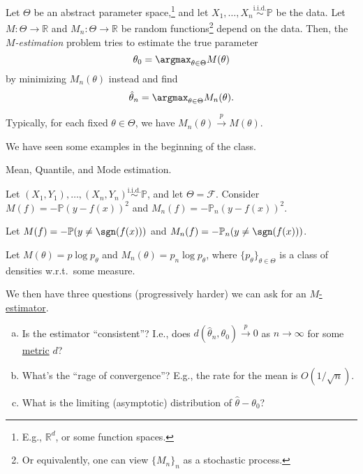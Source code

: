 \begin{problem}[\(M\)-estimation]\label{prb:M-estimation}
Let \(\Theta \) be an abstract parameter space,\footnote{E.g., \(\mathbb{R} ^d\), or some function spaces.} and let \(X_1, \dots , X_n \overset{\text{i.i.d.} }{\sim } \mathbb{P} \) be the data. Let \(M \colon \Theta \to \mathbb{R} \) and \(M_n\colon \Theta \to \mathbb{R} \) be random functions\footnote{Or equivalently, one can view \(\{ M_n \} _n\) as a stochastic process.} depend on the data. Then, the \emph{\(M\)-estimation} problem tries to estimate the true parameter
\[
	\theta _0 = \argmax_{\theta \in \Theta } M(\theta )
\]
by minimizing \(M_n(\theta )\) instead and find
\[
	\hat{\theta} _n = \argmax_{\theta \in \Theta } M_n(\theta ).
\]
\end{problem}

\begin{remark}
	Typically, for each fixed \(\theta \in \Theta \), we have \(M_n(\theta ) \overset{p}{\to } M(\theta )\).
\end{remark}

We have seen some examples in the beginning of the class.

\begin{eg}
	Mean, Quantile, and Mode estimation.
\end{eg}

\begin{eg}
	Let \((X_1, Y_1), \dots , (X_n, Y_n) \overset{\text{i.i.d.} }{\sim } \mathbb{P} \), and let \(\Theta = \mathscr{F} \). Consider \(M(f) = - \mathbb{P} (y - f(x))^2\) and \(M_n(f) = -\mathbb{P} _n (y - f(x))^2\).
\end{eg}

\begin{eg}
	Let \(M(f) = - \mathbb{P} (y \neq \sgn (f(x)))\) and \(M_n(f) = -\mathbb{P} _n(y \neq \sgn (f(x)))\).
\end{eg}

\begin{eg}[MLE]
	Let \(M(\theta ) = p \log p_\theta \) and \(M_n(\theta ) = p_n \log p_\theta \), where \(\{ p_\theta  \}_{\theta \in \Theta } \) is a class of densities w.r.t.\ some measure.
\end{eg}

We then have three questions (progressively harder) we can ask for an \hyperref[prb:M-estimation]{\(M\)-estimator}.
\begin{enumerate}[(a)]
	\item Is the estimator ``consistent''? I.e., does \(d(\hat{\theta} _n, \theta _0) \overset{p}{\to } 0\) as \(n\to \infty \) for some \hyperref[def:pseudo-metric]{metric} \(d\)?
	\item What's the ``rage of convergence''? E.g., the rate for the mean is \(O(1 / \sqrt{n} )\).
	\item What is the limiting (asymptotic) distribution of \(\hat{\theta} - \theta _0\)?
\end{enumerate}

